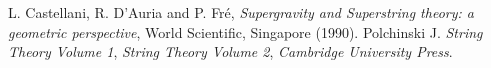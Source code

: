 \documentclass[a4paper,11pt]{article}
\begin{document}
\begin{thebibliography}{99}
%
 L. Castellani, R. D'Auria and P. Fr\'e,
\emph{Supergravity and Superstring theory: a geometric perspective},
World Scientific, Singapore (1990).
%
%
%
%
%
%
%
 Polchinski J.
\emph{String Theory Volume 1},
\emph{String Theory Volume 2},
\emph{Cambridge University Press}.
%
%
%
%
%
%


\end{thebibliography}
\end{document}
